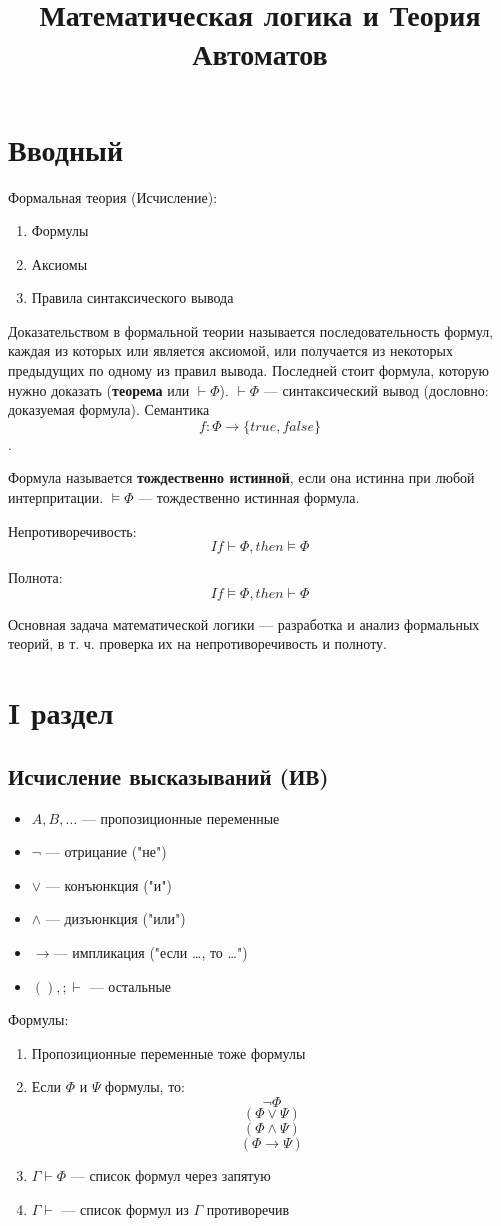 \documentclass[oneside,final,14pt]{extreport}
\begin{document}
\title{Математическая логика и Теория Автоматов}

\maketitle

\chapter*{Вводный}
Формальная теория (Исчисление):
\begin{enumerate}
	\item Формулы
	\item Аксиомы
	\item Правила синтаксического вывода
\end{enumerate}
Доказательством в формальной теории называется последовательность формул, каждая из которых или является аксиомой, или получается из некоторых предыдущих по одному из правил вывода. Последней стоит формула, которую нужно доказать (\textbf{теорема} или $\vdash\Phi$).
$\vdash\Phi$ --- синтаксический вывод (дословно: доказуемая формула). Семантика \[f\colon\Phi\to\{true, false\}\].

Формула называется \textbf{тождественно истинной}, если она истинна при любой интерпритации.
$\models\Phi$ --- тождественно истинная формула.

Непротиворечивость:\[If \vdash \Phi, then \vDash \Phi\]

Полнота:\[If \vDash \Phi, then \vdash \Phi\]

Основная задача математической логики --- разработка и анализ формальных теорий, в т. ч. проверка их на непротиворечивость и полноту.

\chapter*{I раздел}
\section*{Исчисление высказываний (ИВ)}
\begin{itemize}
	\item $A, B, \dots$ --- пропозиционные переменные
	\item $\neg$ --- отрицание ("не")
	\item $\vee$ --- конъюнкция ("и")
	\item $\wedge$ --- дизъюнкция ("или")
	\item $\to$--- импликация ("если \dots, то \dots")
	\item $(),;\vdash$ --- остальные
\end{itemize}
Формулы:
\begin{enumerate}
	\item Пропозиционные переменные тоже формулы
	\item Если $\Phi$ и $\Psi$ формулы, то:
		\[\neg\Phi\]
		\[(\Phi \vee \Psi)\]
		\[(\Phi \wedge \Psi)\]
		\[(\Phi \to \Psi)\]
	\item $\Gamma \vdash \Phi$ --- список формул через запятую
	\item $\Gamma \vdash$ --- список формул из $\Gamma$ противоречив
\end{enumerate}
\end{document}
